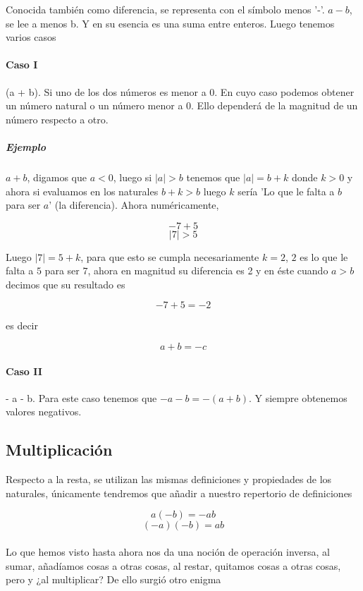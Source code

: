 \documentclass{article}
\begin{document}
Conocida también como diferencia, se representa con el símbolo menos '-'. $a - b$, se lee a menos b. Y en su esencia es una suma entre enteros. Luego tenemos varios casos

\paragraph{Caso I} (a + b). Si uno de los dos números es menor a 0. En cuyo caso podemos obtener un número natural o un número menor a 0. Ello dependerá de la magnitud de un número respecto a otro.

\subparagraph{Ejemplo} $a + b$, digamos que $a < 0$, luego si $|a| > b$ tenemos que $|a| = b + k$ donde $k>0$ y ahora si evaluamos en los naturales $b + k > b$ luego $k$ sería 'Lo que le falta a $b$ para ser $a$' (la diferencia). Ahora numéricamente, 

$$-7 + 5$$
$$|7| > 5$$

Luego $|7| = 5 + k$, para que esto se cumpla necesariamente $k = 2$, $2$ es lo que le falta a $5$ para ser $7$, ahora en magnitud su diferencia es 2 y en éste cuando $a>b$ decimos que su resultado es 

$$-7 + 5 = -2$$

es decir

$$a + b = -c$$

\paragraph{Caso II} - a - b. Para este caso tenemos que $-a - b = -(a+b)$. Y siempre obtenemos valores negativos.

\subsection{Multiplicación}

Respecto a la resta, se utilizan las mismas definiciones y propiedades de los naturales, únicamente tendremos que añadir a nuestro repertorio de definiciones

$$a(-b) = -ab$$
$$(-a)(-b) = ab$$

\paragraph{} Lo que hemos visto hasta ahora nos da una noción de operación inversa, al sumar, añadíamos cosas a otras cosas, al restar, quitamos cosas a otras cosas, pero y ¿al multiplicar? De ello surgió otro enigma
\end{document}
